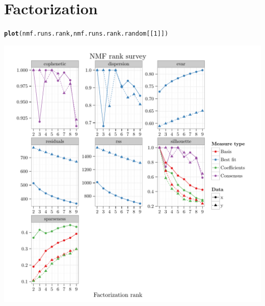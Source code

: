 \documentclass{article}\usepackage[]{graphicx}\usepackage[]{color}
\makeatletter
\def\maxwidth{ %
  \ifdim\Gin@nat@width>\linewidth
    \linewidth
  \else
    \Gin@nat@width
  \fi
}
\newcommand{\hlnum}[1]{\textcolor[rgb]{0.686,0.059,0.569}{#1}}%
\newcommand{\hlstd}[1]{\textcolor[rgb]{0.345,0.345,0.345}{#1}}%
\newcommand{\hlkwd}[1]{\textcolor[rgb]{0.737,0.353,0.396}{\textbf{#1}}}%
\newenvironment{kframe}{%
 \def\at@end@of@kframe{}%
 \ifinner\ifhmode%
  \def\at@end@of@kframe{\end{minipage}}%
  \begin{minipage}{\columnwidth}%
 \fi\fi%
 \def\FrameCommand##1{\hskip\@totalleftmargin \hskip-\fboxsep
 \colorbox{shadecolor}{##1}\hskip-\fboxsep
     \hskip-\linewidth \hskip-\@totalleftmargin \hskip\columnwidth}%
 \MakeFramed {\advance\hsize-\width
   \@totalleftmargin\z@ \linewidth\hsize
   \@setminipage}}%
 {\par\unskip\endMakeFramed%
 \at@end@of@kframe}
\newenvironment{knitrout}{}{} %
\makeatother
\begin{document}
\section{Factorization}
\begin{knitrout}
\color{fgcolor}\begin{kframe}
\begin{alltt}
\hlkwd{plot}\hlstd{(nmf.runs.rank, nmf.runs.rank.random[[}\hlnum{1}\hlstd{]])}
\end{alltt}
\end{kframe}

{\centering \includegraphics[width=\maxwidth]{figure/nmf-rank-plots-1} 

}



\end{knitrout}
\end{document}
